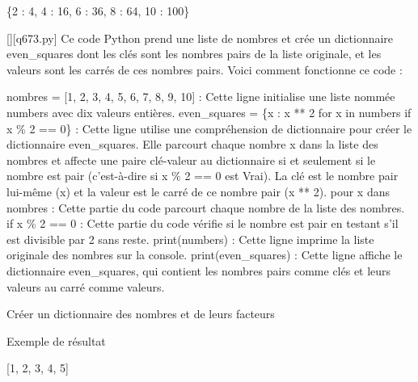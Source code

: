 \{2 : 4, 4 : 16, 6 : 36, 8 : 64, 10 : 100\}
        \par
        \begin{solution}
            \renewcommand{\nomfichier}{q673.py}
            \pythonfile{\chemincode \nomfichier}[][\nomfichier]
            Ce code Python prend une liste de nombres et crée un dictionnaire even\_squares dont les clés sont les nombres pairs de la liste originale, et les valeurs sont les carrés de ces nombres pairs. Voici comment fonctionne ce code :

    nombres = [1, 2, 3, 4, 5, 6, 7, 8, 9, 10] : Cette ligne initialise une liste nommée numbers avec dix valeurs entières.
    even\_squares = \{x : x ** 2 for x in numbers if x \% 2 == 0\} : Cette ligne utilise une compréhension de dictionnaire pour créer le dictionnaire even\_squares. Elle parcourt chaque nombre x dans la liste des nombres et affecte une paire clé-valeur au dictionnaire si et seulement si le nombre est pair (c'est-à-dire si x \% 2 == 0 est Vrai). La clé est le nombre pair lui-même (x) et la valeur est le carré de ce nombre pair (x ** 2).
        pour x dans nombres : Cette partie du code parcourt chaque nombre de la liste des nombres.
        if x \% 2 == 0 : Cette partie du code vérifie si le nombre est pair en testant s'il est divisible par 2 sans reste.
    print(numbers) : Cette ligne imprime la liste originale des nombres sur la console.
    print(even\_squares) : Cette ligne affiche le dictionnaire even\_squares, qui contient les nombres pairs comme clés et leurs valeurs au carré comme valeurs.
        \end{solution}
        

        \question
        Créer un dictionnaire des nombres et de leurs facteurs

Exemple de résultat

[1, 2, 3, 4, 5]

